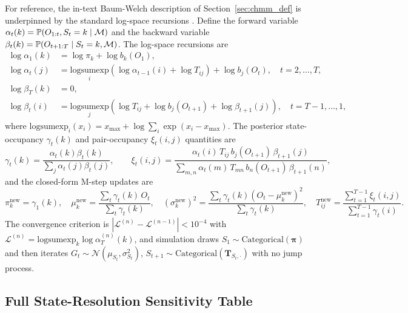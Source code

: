 For reference, the in-text Baum-Welch description of Section~\ref{sec:chmm_def} is underpinned by the standard log-space recursions \cite{rabiner1986introduction, bilmes1998gentle}.
Define the forward variable $\alpha_t(k) = \mathbb{P}(O_{1:t}, S_t = k \mid \mathcal{M})$ and the backward variable $\beta_t(k) = \mathbb{P}(O_{t+1:T} \mid S_t = k, \mathcal{M})$.
The log-space recursions are
\begin{align}
    \log \alpha_1(k) &= \log \pi_k + \log b_k(O_1), \label{eq:forward_init} \\
    \log \alpha_t(j) &= \underset{i}{\text{logsumexp}}\!\left(\log \alpha_{t-1}(i) + \log T_{ij}\right) + \log b_j(O_t), \quad t = 2, \ldots, T, \label{eq:forward} \\[4pt]
    \log \beta_T(k) &= 0, \label{eq:backward_init} \\
    \log \beta_t(i) &= \underset{j}{\text{logsumexp}}\!\left(\log T_{ij} + \log b_j(O_{t+1}) + \log \beta_{t+1}(j)\right), \quad t = T{-}1, \ldots, 1, \label{eq:backward}
\end{align}
where $\text{logsumexp}_i(x_i) = x_{\max} + \log \sum_i \exp(x_i - x_{\max})$.
The posterior state-occupancy $\gamma_t(k)$ and pair-occupancy $\xi_t(i, j)$ quantities are
\begin{equation}
    \gamma_t(k) = \frac{\alpha_t(k) \beta_t(k)}{\sum_j \alpha_t(j) \beta_t(j)}, \qquad
    \xi_t(i, j) = \frac{\alpha_t(i)\, T_{ij}\, b_j(O_{t+1})\, \beta_{t+1}(j)}{\sum_{m,n} \alpha_t(m)\, T_{mn}\, b_n(O_{t+1})\, \beta_{t+1}(n)},
    \label{eq:gamma_xi}
\end{equation}
and the closed-form M-step updates are
\begin{equation}
    \pi_k^{\text{new}} = \gamma_1(k),\quad
    \mu_k^{\text{new}} = \frac{\sum_t \gamma_t(k)\, O_t}{\sum_t \gamma_t(k)},\quad
    \left(\sigma_k^{\text{new}}\right)^2 = \frac{\sum_t \gamma_t(k)(O_t - \mu_k^{\text{new}})^2}{\sum_t \gamma_t(k)},\quad
    T_{ij}^{\text{new}} = \frac{\sum_{t=1}^{T-1} \xi_t(i, j)}{\sum_{t=1}^{T-1} \gamma_t(i)}.
    \label{eq:mstep}
\end{equation}
The convergence criterion is $|\mathcal{L}^{(n)} - \mathcal{L}^{(n-1)}| < 10^{-4}$ with $\mathcal{L}^{(n)} = \text{logsumexp}_k \log \alpha_T^{(n)}(k)$, and simulation draws $S_1 \sim \text{Categorical}(\boldsymbol{\pi})$ and then iterates $G_t \sim \mathcal{N}(\mu_{S_t}, \sigma_{S_t}^2)$, $S_{t+1} \sim \text{Categorical}(\mathbf{T}_{S_t, \cdot})$ with no jump process.

\subsection{Full State-Resolution Sensitivity Table}
\label{sec:sensitivity_table}

